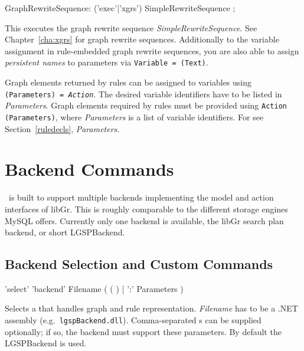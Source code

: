 \makeatletter
\begin{rail}
  GraphRewriteSequence: ('exec'|'xgrs') SimpleRewriteSequence ;
\end{rail}
This executes the graph rewrite sequence \emph{SimpleRewriteSequence}.
See Chapter~\ref{cha:xgrs} for graph rewrite sequences.
Additionally to the variable assignment in rule-embedded graph rewrite sequences, you are also able to assign \emph{persistent names} to parameters via  \texttt{Variable = \@(Text)}.

Graph elements returned by rules can be assigned to variables using \texttt{(Para\-meters) = \emph{Action}}.
The desired variable identifiers have to be listed in \emph{Parameters}.
Graph elements required by rules must be provided using \texttt{Action (Para\-meters)}, where \emph{Parameters} is a list of variable identifiers.
For  see Section~\ref{ruledecls}, \emph{Parameters}.


\section{Backend Commands}
\label{backend}

\GrG\ is built to support multiple backends implementing the model and action interfaces of libGr.
This is roughly comparable to the different storage engines MySQL offers.
Currently only one backend is available, the libGr search plan backend, or short LGSPBackend.

\subsection{Backend Selection and Custom Commands}

\begin{rail}
  'select' 'backend' Filename ( ( ) | ':' Parameters )
\end{rail}
Selects a  that handles graph and rule representation.
\emph{Filename} has to be a .NET assembly (e.g.\ \texttt{lgspBackend.dll}).
Comma-separated s can be supplied optionally; if so, the backend must support these parameters.
By default the LGSPBackend is used.

